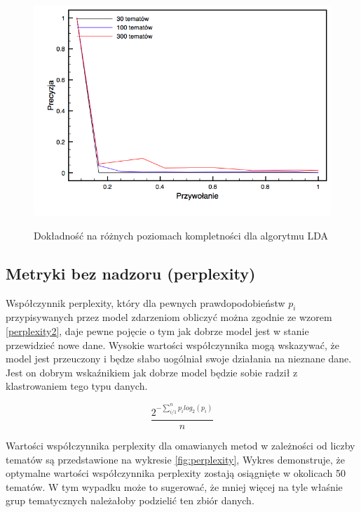 \documentclass[11pt,a4paper]{article}
\begin{document}
\begin{figure}[h]
\caption{Dokładność na różnych poziomach kompletności dla algorytmu LDA}
\includegraphics[width=\linewidth]{gfx/lda_precision.png}
\label{fig:lda_precision}
\end{figure}

\FloatBarrier

\subsection{Metryki bez nadzoru (perplexity)}

Współczynnik perplexity, który dla pewnych prawdopodobieństw $p_i$
przypisywanych przez model zdarzeniom obliczyć można zgodnie ze wzorem
\ref{perplexity2}, daje pewne pojęcie o tym jak dobrze model jest w stanie
przewidzieć nowe dane. Wysokie wartości współczynnika mogą wskazywać, że model
jest przeuczony i będze słabo uogólniał swoje działania na nieznane dane. Jest
on dobrym wskaźnikiem jak dobrze model będzie sobie radził z klastrowaniem tego
typu danych.

\begin{equation}
  \label{perplexity2}
  \frac{2^{-\sum_{i/1}^n p_ilog_2(p_i)}}{n}
\end{equation}

Wartości współczynnika perplexity dla omawianych metod w zależności od liczby
tematów są przedstawione na wykresie \ref{fig:perplexity}, Wykres demonstruje,
że optymalne wartości współczynnika perplexity zostają osiągnięte w okolicach
50 tematów. W tym wypadku może to sugerować, że mniej więcej na tyle właśnie
grup tematycznych należałoby podzielić ten zbiór danych.
\end{document}
